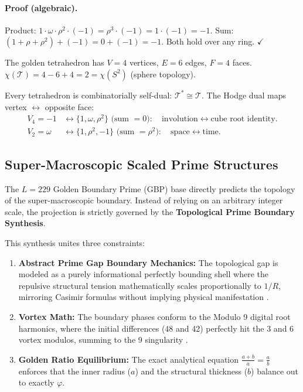 \paragraph{Proof (algebraic).}
Product: $1 \cdot \omega \cdot \rho^2 \cdot (-1)
= \rho^3 \cdot (-1) = 1 \cdot (-1) = -1$.
Sum: $(1 + \rho + \rho^2) + (-1) = 0 + (-1) = -1$.
Both hold over any ring. $\checkmark$

\begin{result}
The golden tetrahedron has $V = 4$ vertices, $E = 6$ edges,
$F = 4$ faces.
$\chi(\mathcal{T}) = 4 - 6 + 4 = 2 = \chi(S^2)$ (sphere topology).

Every tetrahedron is combinatorially self-dual: $\mathcal{T}^* \cong \mathcal{T}$.
The Hodge dual maps vertex $\leftrightarrow$ opposite face:
\begin{align}
  V_4 = -1 &\longleftrightarrow \{1, \omega, \rho^2\} \text{ (sum } = 0\text{)}: \quad
    \text{involution} \leftrightarrow \text{cube root identity.} \\
  V_2 = \omega &\longleftrightarrow \{1, \rho^2, -1\} \text{ (sum } = \rho^2\text{)}: \quad
    \text{space} \leftrightarrow \text{time.}
\end{align}
\end{result}

\subsection{Super-Macroscopic Scaled Prime Structures}
\label{sec:super_macro_scaled}

The $L=229$ Golden Boundary Prime (GBP) base directly predicts the topology of the super-macroscopic boundary. Instead of relying on an arbitrary integer scale, the projection is strictly governed by the \textbf{Topological Prime Boundary Synthesis}. 

This synthesis unites three constraints:
\begin{enumerate}
    \item \textbf{Abstract Prime Gap Boundary Mechanics:} The topological gap is modeled as a purely informational perfectly bounding shell where the repulsive structural tension mathematically scales proportionally to $1/R$, mirroring Casimir formulas without implying physical manifestation \cite{lockwood_zpe2025}.
    \item \textbf{Vortex Math:} The boundary phases conform to the Modulo 9 digital root harmonics, where the initial differences (48 and 42) perfectly hit the 3 and 6 vortex modulos, summing to the 9 singularity \cite{larue_chromatic}.
    \item \textbf{Golden Ratio Equilibrium:} The exact analytical equation $\frac{a+b}{a} = \frac{a}{b}$ enforces that the inner radius ($a$) and the structural thickness ($b$) balance out to exactly $\varphi$.
\end{enumerate}

